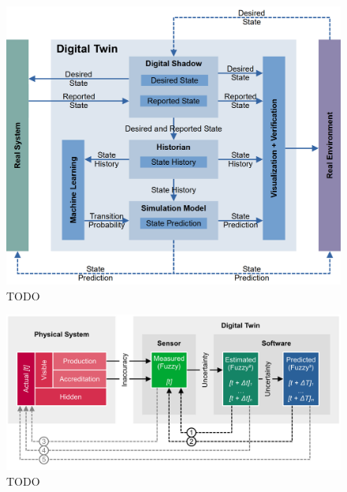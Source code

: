 \documentclass[9pt,conference]{IEEEtran}
\begin{document}
    \begin{figure}[htbp]
        \includegraphics[width=\columnwidth]{Digital Twin.png}
        \caption{TODO}
        \label{todo-1}
    \end{figure}

    \begin{figure}[htbp]
        \includegraphics[width=\columnwidth]{Digital Twin Deviation.png}
        \caption{TODO}
        \label{todo-2}
    \end{figure}
\end{document}
